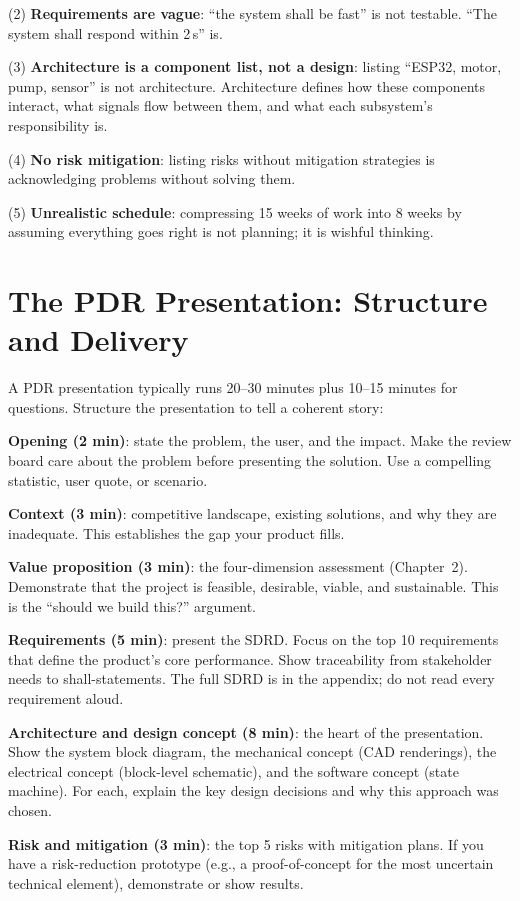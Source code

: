 \documentclass[11pt,letterpaper,twoside,openany]{book}
\begin{document}
(2) \textbf{Requirements are vague}: ``the system shall be fast'' is not testable. ``The system shall respond within 2\,s'' is.

(3) \textbf{Architecture is a component list, not a design}: listing ``ESP32, motor, pump, sensor'' is not architecture. Architecture defines how these components interact, what signals flow between them, and what each subsystem's responsibility is.

(4) \textbf{No risk mitigation}: listing risks without mitigation strategies is acknowledging problems without solving them.

(5) \textbf{Unrealistic schedule}: compressing 15 weeks of work into 8 weeks by assuming everything goes right is not planning; it is wishful thinking.
\section{The PDR Presentation: Structure and Delivery}
A PDR presentation typically runs 20--30 minutes plus 10--15 minutes for questions. Structure the presentation to tell a coherent story:

\textbf{Opening (2 min)}: state the problem, the user, and the impact. Make the review board care about the problem before presenting the solution. Use a compelling statistic, user quote, or scenario.

\textbf{Context (3 min)}: competitive landscape, existing solutions, and why they are inadequate. This establishes the gap your product fills.

\textbf{Value proposition (3 min)}: the four-dimension assessment (Chapter~2). Demonstrate that the project is feasible, desirable, viable, and sustainable. This is the ``should we build this?'' argument.

\textbf{Requirements (5 min)}: present the SDRD. Focus on the top 10 requirements that define the product's core performance. Show traceability from stakeholder needs to shall-statements. The full SDRD is in the appendix; do not read every requirement aloud.

\textbf{Architecture and design concept (8 min)}: the heart of the presentation. Show the system block diagram, the mechanical concept (CAD renderings), the electrical concept (block-level schematic), and the software concept (state machine). For each, explain the key design decisions and why this approach was chosen.

\textbf{Risk and mitigation (3 min)}: the top 5 risks with mitigation plans. If you have a risk-reduction prototype (e.g., a proof-of-concept for the most uncertain technical element), demonstrate or show results.
\end{document}
